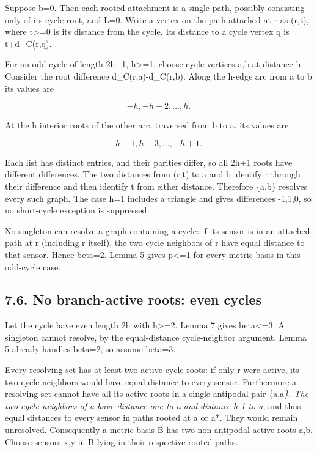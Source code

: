 \documentclass[
]{article}
\begin{document}
Suppose b=0. Then each rooted attachment is a single path, possibly
consisting only of its cycle root, and L=0. Write a vertex on the path
attached at r as (r,t), where t\textgreater=0 is its distance from the
cycle. Its distance to a cycle vertex q is t+d\_C(r,q).

For an odd cycle of length 2h+1, h\textgreater=1, choose cycle vertices
a,b at distance h. Consider the root difference d\_C(r,a)-d\_C(r,b).
Along the h-edge arc from a to b its values are

\[-h,-h+2,\ldots,h.\]

At the h interior roots of the other arc, traversed from b to a, its
values are

\[h-1,h-3,\ldots,-h+1.\]

Each list has distinct entries, and their parities differ, so all 2h+1
roots have different differences. The two distances from (r,t) to a and
b identify r through their difference and then identify t from either
distance. Therefore \{a,b\} resolves every such graph. The case h=1
includes a triangle and gives differences -1,1,0, so no short-cycle
exception is suppressed.

No singleton can resolve a graph containing a cycle: if its sensor is in
an attached path at r (including r itself), the two cycle neighbors of r
have equal distance to that sensor. Hence beta=2. Lemma 5 gives
p\textless=1 for every metric basis in this odd-cycle case.

\subsection{7.6. No branch-active roots: even
cycles}\label{no-branch-active-roots-even-cycles}

Let the cycle have even length 2h with h\textgreater=2. Lemma 7 gives
beta\textless=3. A singleton cannot resolve, by the equal-distance
cycle-neighbor argument. Lemma 5 already handles beta=2, so assume
beta=3.

Every resolving set has at least two active cycle roots: if only r were
active, its two cycle neighbors would have equal distance to every
sensor. Furthermore a resolving set cannot have all its active roots in
a single antipodal pair \{a,a\emph{\}. The two cycle neighbors of a have
distance one to a and distance h-1 to a}, and thus equal distances to
every sensor in paths rooted at a or a*. They would remain unresolved.
Consequently a metric basis B has two non-antipodal active roots a,b.
Choose sensors x,y in B lying in their respective rooted paths.
\end{document}
